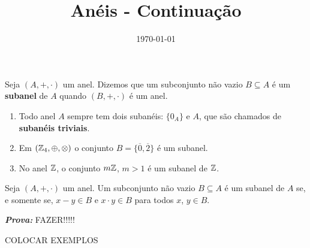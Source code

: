 \documentclass{beamer}
\title{Anéis - Continuação }
\author[\autor]{\autor}
\institute[\instituto]{\instituto}
\date{\today}
\begin{document}
    \begin{frame}
        \maketitle
    \end{frame}

    
    \begin{frame}
        \begin{definicao}
            Seja $(A, +, \cdot)$ um anel. Dizemos que um subconjunto n{\~a}o vazio $B\subseteq A$ {\'e} um \textbf{subanel} de $A$ quando $(B, +, \cdot)$ \'e um anel.
        \end{definicao}

        \begin{exemplos}
            \begin{enumerate}[label={\arabic*})]
                \item Todo anel $A$ sempre tem dois suban{\'e}is: $\{0_{A}\}$ e $A$, que s{\~a}o chamados de \textbf{suban{\'e}is triviais}.

                \vspace{.5cm}

                \item Em $(\mathbb{Z}_4,\oplus,\otimes)$ o conjunto $B = \{\overline{0}, \overline{2}\}$ \'e um subanel.

                \vspace{.5cm}
                
                \item No anel $\mathbb{Z}$, o conjunto $m\mathbb{Z}$, $m > 1$ {\'e} um subanel de $\mathbb{Z}$.

                \vspace{.5cm}
            \end{enumerate} 
        \end{exemplos}
    \end{frame}

    \begin{frame}
        \begin{proposicao}
            Seja $(A, +,\cdot)$ um anel. Um subconjunto n{\~a}o vazio $B\subseteq A$ {\'e} um subanel de $A$ se, e somente se, $x - y \in B$ e $x\cdot y \in B$ para todos $x$, $y \in B$.
        \end{proposicao}

        \noindent \textbf{\textit{Prova: }}FAZER!!!!!

        \begin{exemplos}
            COLOCAR EXEMPLOS
        \end{exemplos}
    \end{frame}
    
\end{document}
